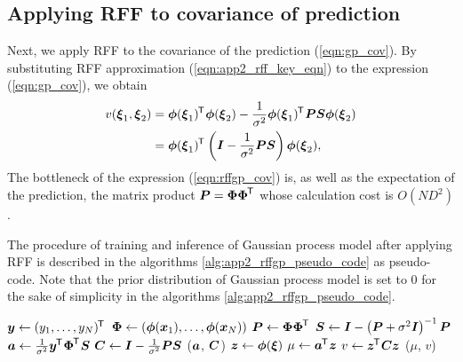 \documentclass[twocolumn,a4paper,10pt]{article}
\begin{document}
\subsection{Applying RFF to covariance of prediction}

Next, we apply RFF to the covariance of the prediction (\ref{eqn:gp_cov}).
By substituting RFF approximation (\ref{eqn:app2_rff_key_eqn}) to the expression (\ref{eqn:gp_cov}),
we obtain
\begin{align}
    v (\boldsymbol{\xi}_1, \boldsymbol{\xi}_2)
    & = \boldsymbol{\phi} (\boldsymbol{\xi}_1)^{\mkern-1.5mu\mathsf{T}}\hspace{0.5pt} \boldsymbol{\phi} (\boldsymbol{\xi}_2)
    - \frac{1}{\sigma^2} \boldsymbol{\phi} (\boldsymbol{\xi}_1)^{\mkern-1.5mu\mathsf{T}}\hspace{0.5pt} \boldsymbol{PS} \boldsymbol{\phi} (\boldsymbol{\xi}_2) \notag \\
    & = \boldsymbol{\phi} (\boldsymbol{\xi}_1)^{\mkern-1.5mu\mathsf{T}}\hspace{0.5pt}
    \left( \boldsymbol{I} - \frac{1}{\sigma^2} \boldsymbol{PS} \right)
    \boldsymbol{\phi} (\boldsymbol{\xi}_2),
    \label{eqn:app2_rffgp_cov}
\end{align}
The bottleneck of the expression (\ref{eqn:rffgp_cov}) is, as well as the expectation of the
prediction, the matrix product $\boldsymbol{P} = \boldsymbol{\Phi \Phi}^{\mkern-1.5mu\mathsf{T}}\hspace{0.5pt}$ whose calculation cost is $O(ND^2)$.

The procedure of training and inference of Gaussian process model after applying RFF is
described in the algorithms \ref{alg:app2_rffgp_pseudo_code} as pseudo-code.
Note that the prior distribution of Gaussian process model is set to 0 for the sake of
simplicity in the algorithms \ref{alg:app2_rffgp_pseudo_code}.

\begin{algorithm}[h]
    \caption{Training of the GP model after RFF (2)}
    \label{alg:app2_rffgp_pseudo_code}
    \begin{algorithmic}[1]
        \State $\boldsymbol{y} \gets (y_1, \ldots, y_N)^{\mkern-1.5mu\mathsf{T}}\hspace{0.5pt}$
        \State $\boldsymbol{\Phi} \gets (\boldsymbol{\phi}(\boldsymbol{x}_1), \ldots, \boldsymbol{\phi}(\boldsymbol{x}_N))$
        \State $\boldsymbol{P} \gets \boldsymbol{\Phi\Phi}^{\mkern-1.5mu\mathsf{T}}\hspace{0.5pt}$
        \State $\boldsymbol{S} \gets \boldsymbol{I} - \left( \boldsymbol{P} + \sigma^2 \boldsymbol{I} \right)^{-1} \boldsymbol{P}$
        \State $\boldsymbol{a} \gets \frac{1}{\sigma^2} \boldsymbol{y}^{\mkern-1.5mu\mathsf{T}}\hspace{0.5pt} \boldsymbol{\Phi}^{\mkern-1.5mu\mathsf{T}}\hspace{0.5pt} \boldsymbol{S}$
        \State $\boldsymbol{C} \gets \boldsymbol{I} - \frac{1}{\sigma^2} \boldsymbol{PS}$
        \State \Return ($\boldsymbol{a}$, $\boldsymbol{C}$)
    \EndFunction
    \State
        \State $\boldsymbol{z} \gets \boldsymbol{\phi}(\boldsymbol{\xi})$
        \State $\mu \gets \boldsymbol{a}^{\mkern-1.5mu\mathsf{T}}\hspace{0.5pt} \boldsymbol{z}$
        \State $v \gets \boldsymbol{z}^{\mkern-1.5mu\mathsf{T}}\hspace{0.5pt} \boldsymbol{C} \boldsymbol{z}$
        \State \Return ($\mu$, $v$)
    \EndFunction
    \end{algorithmic}
\end{algorithm}
\end{document}
